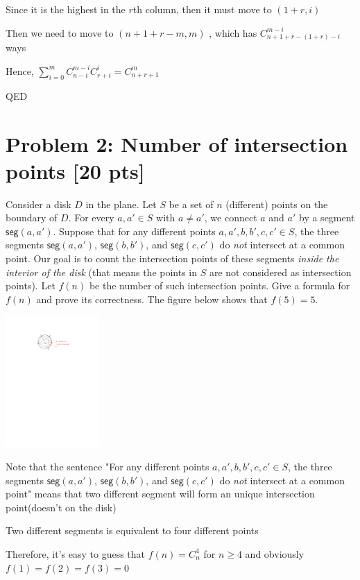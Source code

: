 \documentclass[11pt,twoside]{article}
\newcommand{\problem}[1]{\section*{Problem #1}}
\begin{document}
Since it is the highest in the $r$th column, then it must move to $(1+r,i)$

Then we need to move to $(n+1+r-m,m)$
, which has $C^{m-i}_{n+1+r-(1+r)-i}$ ways

Hence, $\sum ^m _{i =0} C^{m-i}_{n-i} C^i_{r+i} = C_{n+r+1}^{m}$

QED








\problem{2: Number of intersection points [20 pts]}
Consider a disk $D$ in the plane.
Let $S$ be a set of $n$ (different) points on the boundary of $D$.
For every $a,a' \in S$ with $a \neq a'$, we connect $a$ and $a'$ by a segment $\mathsf{seg}(a,a')$.
Suppose that for any different points $a,a',b,b',c,c' \in S$, the three segments $\mathsf{seg}(a,a')$, $\mathsf{seg}(b,b')$, and $\mathsf{seg}(c,c')$ do \textit{not} intersect at a common point.
Our goal is to count the intersection points of these segments \textit{inside the interior of the disk} (that means the points in $S$ are not considered as intersection points).
Let $f(n)$ be the number of such intersection points.
Give a formula for $f(n)$ and prove its correctness.
The figure below shows that $f(5) = 5$.

\begin{center}
    \includegraphics[height=5cm]{hw-fig-intersection.pdf}
\end{center}

\hspace*{\fill}

Note that the sentence "For any different points $a,a',b,b',c,c' \in S$, the three segments $\mathsf{seg}(a,a')$, $\mathsf{seg}(b,b')$, and $\mathsf{seg}(c,c')$ do \textit{not} intersect at a common point" means that two different segment will form an unique intersection point(doesn't on the disk)

Two different segments is equivalent to four different points

Therefore, it's easy to guess that $f(n) = C^4_n$ for $n\geq 4$ and obviously $f(1) =f(2) =f(3) =0$
\end{document}
